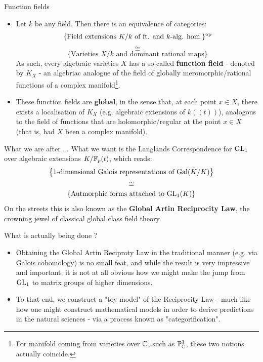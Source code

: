 \documentclass[professionalfonts]{beamer}
\begin{document}
    \begin{frame}{Function fields}
        \begin{itemize}
            \item Let $k$ be any field. Then there is an equivalence of categories:
                $$\{\text{Field extensions $K/k$ of ft. and $k$-alg. hom.}\}^{\mathrm{op}}$$
                $$\cong$$
                $$\{\text{Varieties $X/k$ and dominant rational maps}\}$$
            As such, every algebraic varieties $X$ has a so-called \textbf{function field} - denoted by $K_X$ - an algebriac analogue of the field of globally meromorphic/rational functions of a complex manifold\footnote{For manifold coming from varieties over $\mathbb{C}$, such as $\mathbb{P}^1_{\mathbb{C}}$, these two notions actually coincide.}.
            \item These function fields are \textbf{global}, in the sense that, at each point $x \in X$, there exists a localisation of $K_X$ (e.g. algebraic extensions of $k(\!(t)\!)$), analogous to the field of functions that are holomorphic/regular at the point $x \in X$ (that is, had $X$ been a complex manifold). 
        \end{itemize}
    \end{frame}
    
    \begin{frame}{What we are after ...}
        What we want is the Langlands Correspondence for $\operatorname{GL}_1$ over algebraic extensions $K/\mathbb{F}_p(t)$, which reads:
            $$\left\{\text{$1$-dimensional Galois representations of $\mathrm{Gal}(\bar{K}/K)$}\right\}$$
            $$\cong$$
            $$\left\{\text{Autmorphic forms attached to $\operatorname{GL}_1(K)$}\right\}$$
        On the streets this is also known as the \textbf{Global Artin Reciprocity Law}, the crowning jewel of classical global class field theory.
    \end{frame}
    
    \begin{frame}{What is actually being done ?}
        \begin{itemize}
            \item Obtaining the Global Artin Reciproty Law in the traditional manner (e.g. via Galois cohomology) is no small feat, and while the result is very impressive and important, it is not at all obvious how we might make the jump from $\operatorname{GL}_1$ to matrix groups of higher dimensions.
            \item To that end, we construct a "toy model" of the Reciprocity Law - much like how one might construct mathematical models in order to derive predictions in the natural sciences - via a process known as "categorification".
        \end{itemize}
    \end{frame}
    
\end{document}
